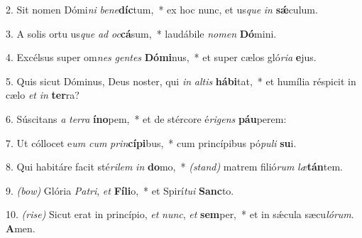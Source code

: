 2. Sit nomen Dómi\textit{ni} \textit{be}\textit{ne}\textbf{díc}tum,~* 
	ex hoc nunc, et us\textit{que} \textit{in} \textbf{s\'{\ae}}culum.

3. A solis ortu us\textit{que} \textit{ad} \textit{oc}\textbf{cá}sum,~* 
	laudábile \textit{no}\textit{men} \textbf{Dó}mini.

4. Excélsus super om\textit{nes} \textit{gen}\textit{tes} \textbf{Dó}\textbf{mi}nus,~* 
	et super cælos gló\textit{ri}\textit{a} \textbf{e}jus.

5. Quis sicut Dóminus, Deus noster, qui \textit{in} \textit{al}\textit{tis} \textbf{há}\textbf{bi}tat,~* 
	et humília réspicit in cælo \textit{et} \textit{in} \textbf{ter}ra?

6. Súscitans \textit{a} \textit{ter}\textit{ra} \textbf{ín}\textbf{o}pem,~* 
	et de stércore é\textit{ri}\textit{gens} \textbf{páu}perem:

7. Ut cóllocet e\textit{um} \textit{cum} \textit{prin}\textbf{cí}\textbf{pi}bus,~* 
	cum princípibus pó\textit{pu}\textit{li} \textbf{su}i.

8. Qui habitáre facit sté\textit{ri}\textit{lem} \textit{in} \textbf{do}mo,~* 
	{\color{red}\textit{(stand)}}  matrem filió\textit{rum} \textit{læ}\textbf{tán}tem.

9. {\color{red}\textit{(bow)}} Glória \textit{Pa}\textit{tri}, \textit{et} \textbf{Fí}\textbf{li}o,~* 
	et Spirí\textit{tu}\textit{i} \textbf{Sanc}to.

10. {\color{red}\textit{(rise)}}  Sicut erat in princípio, \textit{et} \textit{nunc}, \textit{et} \textbf{sem}per,~* 
	et in s\'{\ae}cula sæcu\textit{ló}\textit{rum}. \textbf{A}men.